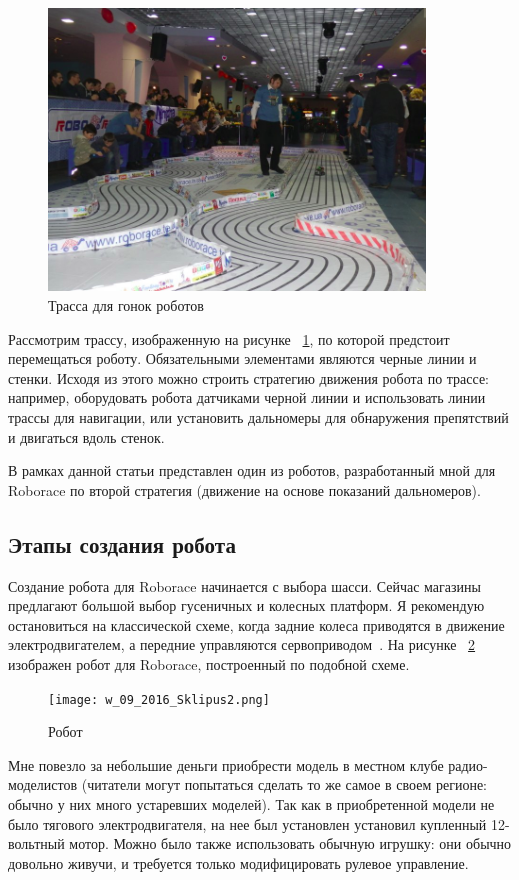 \documentclass[10pt, a5paper]{article}
\begin{document}
\begin{figure}[h!]
  \centering
  \includegraphics[width=10cm]{w_09_2016_Sklipus1.png}
  \caption {Трасса для гонок роботов}\label{Sklipus1}
\end{figure}

Рассмотрим трассу, изображенную на рисунке ~\ref{Sklipus1}, по которой предстоит перемещаться роботу. Обязательными элементами являются черные линии и стенки. Исходя из этого можно строить стратегию движения робота по трассе: например, оборудовать робота датчиками черной линии и использовать линии трассы для навигации, или установить дальномеры для обнаружения препятствий и двигаться вдоль стенок.

В рамках данной статьи представлен один из роботов, разработанный мной для Roborace по второй стратегия (движение на основе показаний дальномеров).

\subsection*{Этапы создания робота}

Создание робота для Roborace начинается с выбора шасси. Сейчас магазины предлагают большой выбор гусеничных и колесных платформ. Я рекомендую остановиться на классической схеме, когда задние колеса приводятся в движение электродвигателем, а передние управляются сервоприводом~\cite{Sklipus1}. На рисунке ~\ref{Sklipus2} изображен робот для Roborace, построенный по подобной схеме.

\begin{figure}[h!]
  \centering
  \texttt{[image: w\_09\_2016\_Sklipus2.png]}
  \caption {Робот}\label{Sklipus2}
\end{figure}

Мне повезло за небольшие деньги приобрести модель в местном клубе радио-моделистов (читатели могут попытаться сделать то же самое в своем регионе: обычно у них много устаревших моделей). Так как в приобретенной модели не было тягового электродвигателя, на нее был установлен установил купленный 12-вольтный мотор. Можно было также использовать обычную игрушку: они обычно довольно живучи, и требуется только модифицировать рулевое управление.
\end{document}
